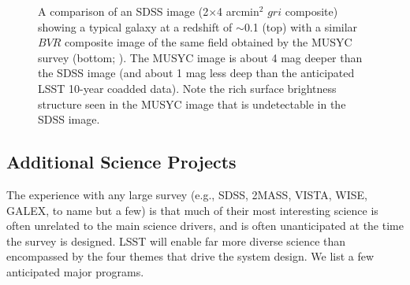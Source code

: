 \begin{figure}
\caption{
A comparison of an SDSS image (2$\times$4 arcmin$^2$ $gri$ composite) showing a typical galaxy at
a redshift of $\sim$0.1 (top) with a similar $BVR$ composite image of the same field obtained by the MUSYC survey (bottom;
\cite{2006ApJS..162....1G}). The MUSYC image is about 4 mag deeper than the SDSS image (and about 1 mag less deep
than the anticipated LSST 10-year coadded data). Note the rich surface brightness structure seen in the MUSYC
image that is undetectable in the SDSS image.}
\label{Fig:musyc}
\end{figure}


\subsection{  Additional Science Projects}

The experience with any large survey (e.g., SDSS, 2MASS, VISTA, WISE, GALEX, to name but a
few) is that much of their most interesting science is often unrelated to
the main science drivers, and is often unanticipated at the time the survey is
designed. LSST will enable far more diverse science than encompassed by the
four themes that drive the system design. We list a few anticipated major
programs.

